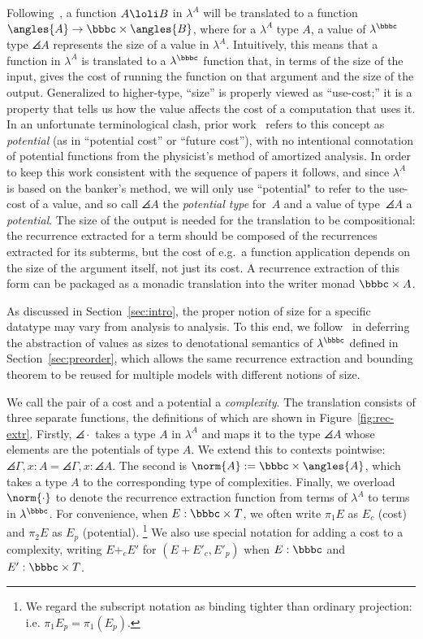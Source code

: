 Following~\cite{danner-et-al:plpv13,danner-et-al:icfp15}, a function $A
\loli B$ in $\lambda^A$ will be translated to a function \mbox{$\angles{A}
\to \bbbc \times \angles{B}$}, where for a $\lambda^A$ type $A$, a value of
$\lambda^\bbbc$ type $\angles{A}$ represents the size of a value in
$\lambda^A$.  Intuitively, this means that a function in $\lambda^A$ is
translated to a $\lambda^{\bbbc}$ function that, in terms of the size of the
input, gives the cost of running the function on that argument and the size
of the output.  Generalized to higher-type, ``size'' is properly viewed as
``use-cost;'' it is a property that tells us how the value affects the cost
of a computation that uses it.  In an unfortunate terminological clash,
prior work~\cite{danner-royer:ats-lmcs} refers to this concept as
\emph{potential} (as in ``potential cost'' or ``future cost''), with no
intentional connotation of potential functions from the physicist's method
of amortized analysis.  In order to keep this work consistent with the
sequence of papers it follows, and since $\lambda^A$ is based on the
banker's method, we will only use ``potential" to refer to the use-cost of a
value, and so call $\angles{A}$ the \emph{potential type} for~$A$ and a
value of type~$\angles A$ a \emph{potential}.  The size of the output is
needed for the translation to be compositional: the recurrence extracted for
a term should be composed of the recurrences extracted for its subterms, but
the cost of e.g.\ a function application depends on the size of the argument
itself, not just its cost.  A recurrence extraction of this form can be
packaged as a monadic translation into the writer monad $\bbbc \times A$.  

As discussed in Section~\ref{sec:intro}, the proper notion of size for a
specific datatype may vary from analysis to analysis. To this end, we
follow~\cite{danner-et-al:icfp15} in deferring the
abstraction of values as sizes to denotational semantics of
$\lambda^\bbbc$ defined in Section~\ref{sec:preorder}, which allows the
same recurrence extraction and bounding theorem to be reused for
multiple models with different notions of size.

We call the pair of a cost and a potential a \textit{complexity}.  The
translation consists of three separate functions, the definitions of
which are shown in Figure~\ref{fig:rec-extr}. Firstly, $\angles{\cdot}$
takes a type $A$ in $\lambda^A$ and maps it to the type $\angles{A}$
whose elements are the potentials of type $A$. We extend this to contexts pointwise:
$\angles{\Gamma,x : A} = \angles{\Gamma},x:\angles{A}$.
The second is $\norm{A}
:= \bbbc \times \angles{A}$, which takes a type $A$ to the corresponding
type of complexities. Finally, we overload $\norm{\cdot}$ to denote the
recurrence extraction function from terms of $\lambda^A$ to terms in
$\lambda^\bbbc$.  For convenience, when $E : \bbbc \times T$, we often
write $\pi_1 E$ as $E_c$ (cost) and $\pi_2 E$ as $E_p$ (potential).
\footnote{We regard the subscript notation as binding tighter than
ordinary projection: i.e. $\pi_1E_p = \pi_1(E_p)$.
}
We
also use special notation for adding a cost to a complexity, writing
$E+_c E'$ for $(E + E'_c,E'_p)$ when $E : \bbbc$ and $E' : \bbbc \times
T$.

